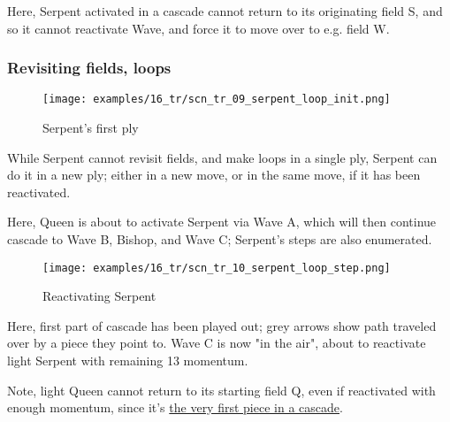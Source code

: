 Here, Serpent activated in a cascade cannot return to its originating field S,
and so it cannot reactivate Wave, and force it to move over to e.g. field W.

\clearpage %

\subsubsection*{Revisiting fields, loops}
\label{sec:Tamoanchan Revisited/Serpent/Movement/Revisiting fields, loops}

\vspace*{-1.2\baselineskip}
\noindent
\begin{figure}[!h]
\texttt{[image: examples/16\_tr/scn\_tr\_09\_serpent\_loop\_init.png]}
\caption{Serpent's first ply}
\label{fig:scn_tr_09_serpent_loop_init}
\end{figure}

While Serpent cannot revisit fields, and make loops in a single ply, Serpent can
do it in a new ply; either in a new move, or in the same move, if it has been
reactivated.

Here, Queen is about to activate Serpent via Wave A, which will then continue
cascade to Wave B, Bishop, and Wave C; Serpent's steps are also enumerated.

\clearpage %

\vspace*{-2.1\baselineskip}
\noindent
\begin{figure}[!h]
\texttt{[image: examples/16\_tr/scn\_tr\_10\_serpent\_loop\_step.png]}
\caption{Reactivating Serpent}
\label{fig:scn_tr_10_serpent_loop_step}
\end{figure}

Here, first part of cascade has been played out; grey arrows show path traveled
over by a piece they point to. Wave C is now "in the air", about to reactivate
light Serpent with remaining 13 momentum.

Note, light Queen cannot return to its starting field Q, even if reactivated with
enough momentum, since it's
\hyperref[fig:scn_mv_53_static_move_is_illegal_init]{the very first piece in a cascade}.

\clearpage %

